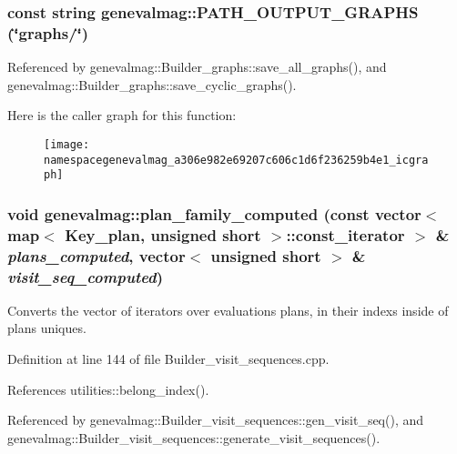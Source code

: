 \hypertarget{namespacegenevalmag_a306e982e69207c606c1d6f236259b4e1}{
\subsubsection[{PATH\_\-OUTPUT\_\-GRAPHS}]{\setlength{\rightskip}{0pt plus 5cm}const string genevalmag::PATH\_\-OUTPUT\_\-GRAPHS (\char`\"{}graphs/\char`\"{})}}
\label{namespacegenevalmag_a306e982e69207c606c1d6f236259b4e1}


Referenced by genevalmag::Builder\_\-graphs::save\_\-all\_\-graphs(), and genevalmag::Builder\_\-graphs::save\_\-cyclic\_\-graphs().



Here is the caller graph for this function:\nopagebreak
\begin{figure}[H]
\begin{center}
\leavevmode
\texttt{[image: namespacegenevalmag\_a306e982e69207c606c1d6f236259b4e1\_icgraph]}
\end{center}
\end{figure}


\hypertarget{namespacegenevalmag_a22c7e9c74db3b8c0f0b7a3a1cbf5a978}{
\subsubsection[{plan\_\-family\_\-computed}]{\setlength{\rightskip}{0pt plus 5cm}void genevalmag::plan\_\-family\_\-computed (const vector$<$ map$<$ Key\_\-plan, unsigned short $>$::const\_\-iterator $>$ \& {\em plans\_\-computed}, \/  vector$<$ unsigned short $>$ \& {\em visit\_\-seq\_\-computed})}}
\label{namespacegenevalmag_a22c7e9c74db3b8c0f0b7a3a1cbf5a978}
Converts the vector of iterators over evaluations plans, in their indexs inside of plans uniques. 

Definition at line 144 of file Builder\_\-visit\_\-sequences.cpp.



References utilities::belong\_\-index().



Referenced by genevalmag::Builder\_\-visit\_\-sequences::gen\_\-visit\_\-seq(), and genevalmag::Builder\_\-visit\_\-sequences::generate\_\-visit\_\-sequences().



